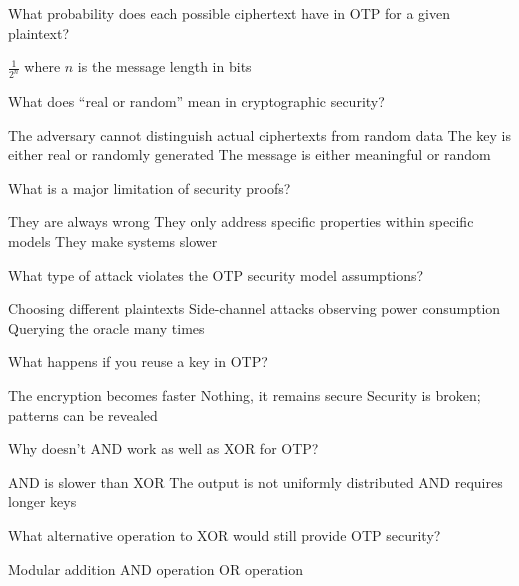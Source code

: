 \documentclass[10pt,a4paper,american]{exam}
\begin{document}
\begin{questions}
	\question What probability does each possible ciphertext have in OTP for a given plaintext?
	\begin{randomizechoices}
		\CorrectChoice $\frac{1}{2^n}$ where $n$ is the message length in bits
	\end{randomizechoices}

	\question What does ``real or random'' mean in cryptographic security?
	\begin{randomizechoices}
		\CorrectChoice The adversary cannot distinguish actual ciphertexts from random data
		\choice The key is either real or randomly generated
		\choice The message is either meaningful or random
	\end{randomizechoices}

	\question What is a major limitation of security proofs?
	\begin{randomizechoices}
		\choice They are always wrong
		\CorrectChoice They only address specific properties within specific models
		\choice They make systems slower
	\end{randomizechoices}

	\question What type of attack violates the OTP security model assumptions?
	\begin{randomizechoices}
		\choice Choosing different plaintexts
		\CorrectChoice Side-channel attacks observing power consumption
		\choice Querying the oracle many times
	\end{randomizechoices}

	\question What happens if you reuse a key in OTP?
	\begin{randomizechoices}
		\choice The encryption becomes faster
		\choice Nothing, it remains secure
		\CorrectChoice Security is broken; patterns can be revealed
	\end{randomizechoices}

	\question Why doesn't AND work as well as XOR for OTP?
	\begin{randomizechoices}
		\choice AND is slower than XOR
		\CorrectChoice The output is not uniformly distributed
		\choice AND requires longer keys
	\end{randomizechoices}

	\question What alternative operation to XOR would still provide OTP security?
	\begin{randomizechoices}
		\CorrectChoice Modular addition
		\choice AND operation
		\choice OR operation
	\end{randomizechoices}


\end{questions}
\end{document}
